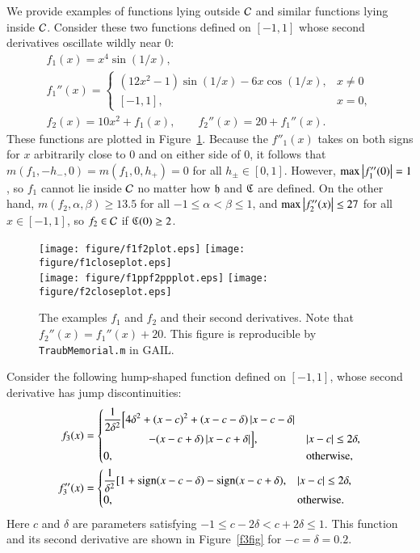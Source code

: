 \documentclass[review]{elsarticle}
\theoremstyle{definition}
\begin{document}
We provide examples of functions lying outside $\mathcal{C}$
and similar functions lying inside $\mathcal{C}$. Consider these two functions defined
on $[-1,1]$ whose second derivatives oscillate wildly near $0$:
\begin{gather*}
f_1(x) = x^4 \sin(1/x), \\
 f_1''(x) = \begin{cases} (12x^2 - 1) \sin(1/x) -6 x \cos(1/x), & x \ne 0 \\
 [-1,1], & x = 0, \end{cases} \\
f_2(x) = 10  x^2 + f_1(x), \qquad f_2''(x) = 20+ f_1''(x).
\end{gather*}
These functions are plotted in Figure~\ref{f1f2fig}. Because the $f''_1(x)$
takes on both signs for $x$ arbitrarily close to $0$ and on either side of $0$,
it follows that  $m(f_1,-h_-,0) = m(f_1,0,h_+) = 0$ for all $h_\pm \in [0,1]$.
However, $\max\left \lvert f''_1(0) \right \rvert = 1$, so $f_1$ cannot lie inside
$\mathcal{C}$ no matter how $\mathfrak{h}$ and $\mathfrak{C}$ are defined. On the other hand,
$m(f_2,\alpha, \beta) \ge 13.5$ for all $-1 \le \alpha < \beta \le 1$, and
$\max \left \lvert f''_2(x) \right \rvert \le 27$ for all $x \in [-1,1]$, so $f_2 \in
\mathcal{C}$ if $\mathfrak{C}(0) \ge 2$.

\begin{figure}[t]
\centering
\texttt{[image: figure/f1f2plot.eps]} \quad
\texttt{[image: figure/f1closeplot.eps]} \\
\texttt{[image: figure/f1ppf2ppplot.eps]} \quad
\texttt{[image: figure/f2closeplot.eps]}
\caption{The examples $f_1$ and $f_2$ and their second derivatives. Note that
$f_2''(x) = f_1''(x) + 20$. This figure is reproducible by {\tt TraubMemorial.m}
in GAIL.}
\label{f1f2fig}
\end{figure}

Consider the following hump-shaped function defined on $[-1,1]$, whose second derivative has jump discontinuities:
\begin{align} \label{f3def}
f_3(x) & = \begin{cases} \displaystyle
   \frac{1}{2\delta^2} \Bigl [4 \delta^2 + (x-c)^2 + (x-c-\delta)\left \lvert x-c-\delta \right \rvert
\\ \qquad \qquad
    - (x-c+\delta)\left \lvert x-c+\delta \right \rvert \Bigr ], & \left \lvert x-c \right \rvert \le 2\delta,
\\ 0, & \text{otherwise},
\end{cases} \\
\nonumber
f''_3(x) & =
\begin{cases} \displaystyle
    \frac{1}{\delta^2} [1 + \operatorname{sign}(x-c-\delta) - \operatorname{sign}(x-c+\delta), & \left \lvert x-c \right \rvert \le 2\delta,
\\ 0, & \text{otherwise}.
\end{cases}
\end{align}
Here $c$ and $\delta$ are parameters satisfying $-1 \le c-2 \delta < c+ 2\delta \le 1$. This function and its second derivative
are shown in Figure~\ref{f3fig} for $-c=\delta = 0.2$.
\end{document}
